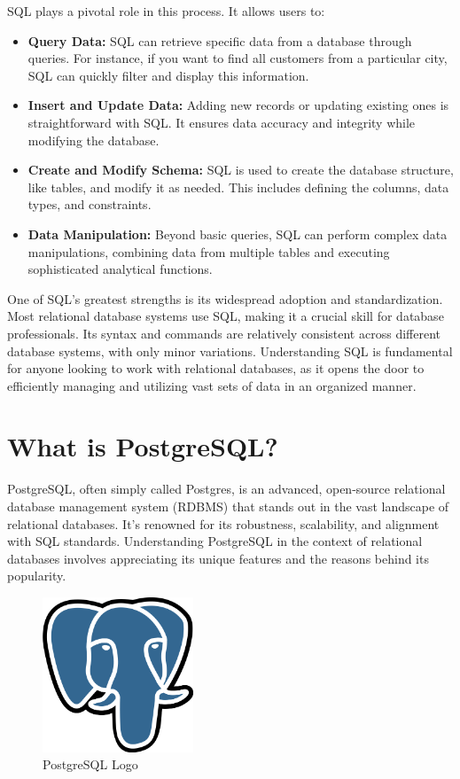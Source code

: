 SQL plays a pivotal role in this process. It allows users to:

\begin{itemize}
\item \textbf{Query Data:} SQL can retrieve specific data from a database through queries. For instance, if you want to find all customers from a particular city, SQL can quickly filter and display this information.
\item \textbf{Insert and Update Data:} Adding new records or updating existing ones is straightforward with SQL. It ensures data accuracy and integrity while modifying the database.
\item \textbf{Create and Modify Schema:} SQL is used to create the database structure, like tables, and modify it as needed. This includes defining the columns, data types, and constraints.
\item \textbf{Data Manipulation:} Beyond basic queries, SQL can perform complex data manipulations, combining data from multiple tables and executing sophisticated analytical functions.
\end{itemize}

One of SQL's greatest strengths is its widespread adoption and standardization. Most relational database systems use SQL, making it a crucial skill for database professionals. Its syntax and commands are relatively consistent across different database systems, with only minor variations. Understanding SQL is fundamental for anyone looking to work with relational databases, as it opens the door to efficiently managing and utilizing vast sets of data in an organized manner.

\section{What is PostgreSQL?}
PostgreSQL, often simply called Postgres, is an advanced, open-source relational database management system (RDBMS) that stands out in the vast landscape of relational databases. It's renowned for its robustness, scalability, and alignment with SQL standards. Understanding PostgreSQL in the context of relational databases involves appreciating its unique features and the reasons behind its popularity.

\begin{figure}[htbp]
    \centering
    \includegraphics[width=0.4\textwidth]{content/1-relational-databases/figures/PostgreSQL_logo.3colors.540x557.png}
    \caption{PostgreSQL Logo}
    \label{fig:PostgreSQL_logo.3colors.540x557.png}
\end{figure}

